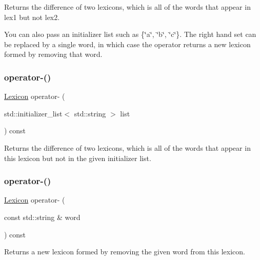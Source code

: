 Returns the difference of two lexicons, which is all of the words that appear in {\ttfamily lex1} but not {\ttfamily lex2}. 

You can also pass an initializer list such as \{\char`\"{}a\char`\"{}, \char`\"{}b\char`\"{}, \char`\"{}c\char`\"{}\}. The right hand set can be replaced by a single word, in which case the operator returns a new lexicon formed by removing that word. \mbox{\label{classLexicon_a0cd415d08567bfae9eae12afe2169cb5}} 
\subsubsection{\texorpdfstring{operator-\/()}{operator-()}\hspace{0.1cm}{\footnotesize\ttfamily [2/3]}}
{\footnotesize\ttfamily \mbox{\hyperlink{classLexicon}{Lexicon}} operator-\/ (\begin{DoxyParamCaption}\item[{std\+::initializer\+\_\+list$<$ std\+::string $>$}]{list }\end{DoxyParamCaption}) const}



Returns the difference of two lexicons, which is all of the words that appear in this lexicon but not in the given initializer list. 

\mbox{\label{classLexicon_a14c8fea4b958b02ea5ee55d5509db8e6}} 
\subsubsection{\texorpdfstring{operator-\/()}{operator-()}\hspace{0.1cm}{\footnotesize\ttfamily [3/3]}}
{\footnotesize\ttfamily \mbox{\hyperlink{classLexicon}{Lexicon}} operator-\/ (\begin{DoxyParamCaption}\item[{const std\+::string \&}]{word }\end{DoxyParamCaption}) const}



Returns a new lexicon formed by removing the given word from this lexicon. 

\mbox{\label{classLexicon_ac51e54102d6257c1a0a48c99ad2520f6}} 
